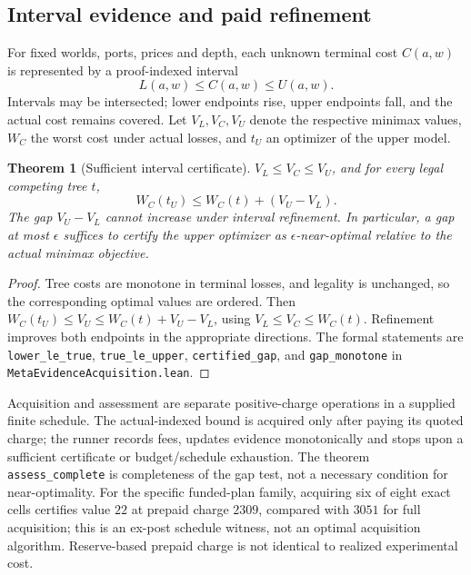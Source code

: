 \documentclass[10pt,letterpaper]{article}
\newtheorem{theorem}{Theorem}[section]
\newcommand{\rc}[1]{\texttt{#1}}
\begin{document}
\subsection{Interval evidence and paid refinement}
For fixed worlds, ports, prices and depth, each unknown terminal cost $C(a,w)$ is represented by a proof-indexed interval
\[
  L(a,w)\le C(a,w)\le U(a,w).
\]
Intervals may be intersected; lower endpoints rise, upper endpoints fall, and the actual cost remains covered. Let $V_L,V_C,V_U$ denote the respective minimax values, $W_C$ the worst cost under actual losses, and $t_U$ an optimizer of the upper model.
\begin{theorem}[Sufficient interval certificate]\label{thm:interval}
$V_L\le V_C\le V_U$, and for every legal competing tree $t$,
\[
 W_C(t_U)\le W_C(t)+(V_U-V_L).
\]
The gap $V_U-V_L$ cannot increase under interval refinement. In particular, a gap at most $\epsilon$ suffices to certify the upper optimizer as $\epsilon$-near-optimal relative to the actual minimax objective.
\end{theorem}
\begin{proof}
Tree costs are monotone in terminal losses, and legality is unchanged, so the corresponding optimal values are ordered. Then $W_C(t_U)\le V_U\le W_C(t)+V_U-V_L$, using $V_L\le V_C\le W_C(t)$. Refinement improves both endpoints in the appropriate directions. The formal statements are \rc{lower\_le\_true}, \rc{true\_le\_upper}, \rc{certified\_gap}, and \rc{gap\_monotone} in \rc{MetaEvidenceAcquisition.lean}.
\end{proof}
Acquisition and assessment are separate positive-charge operations in a supplied finite schedule. The actual-indexed bound is acquired only after paying its quoted charge; the runner records fees, updates evidence monotonically and stops upon a sufficient certificate or budget/schedule exhaustion. The theorem \rc{assess\_complete} is completeness of the gap test, not a necessary condition for near-optimality. For the specific funded-plan family, acquiring six of eight exact cells certifies value $22$ at prepaid charge $2309$, compared with $3051$ for full acquisition; this is an ex-post schedule witness, not an optimal acquisition algorithm. Reserve-based prepaid charge is not identical to realized experimental cost.
\end{document}
